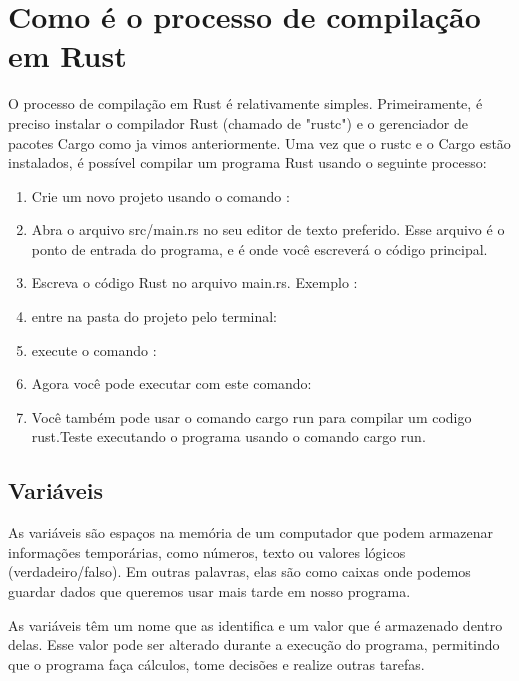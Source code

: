 \documentclass[12pt,a4paper,oneside]{abntex2}
\begin{document}
\section{Como é o processo de compilação em Rust}

O processo de compilação em Rust é relativamente simples. Primeiramente, é preciso instalar o compilador Rust (chamado de "rustc") e o gerenciador de pacotes Cargo como ja vimos anteriormente.
Uma vez que o rustc e o Cargo estão instalados, é possível compilar um programa Rust usando o seguinte processo:
\begin{enumerate}
    \item Crie um novo projeto usando o comando :
    
    \item Abra o arquivo src/main.rs no seu editor de texto preferido. Esse arquivo é o ponto de entrada do programa, e é onde você escreverá o código principal.
    \item Escreva o código Rust no arquivo main.rs. Exemplo :
    
    \item entre na pasta do projeto pelo terminal:
    \item execute o comando :
        
    \item Agora você pode executar com este comando:
    
    \item Você também pode usar o comando  cargo run para compilar um codigo rust.Teste executando o programa usando o comando cargo run.
\end{enumerate}

\subsection{Variáveis}
As variáveis são espaços na memória de um computador que podem armazenar informações temporárias, como números, texto ou valores lógicos (verdadeiro/falso). Em outras palavras, elas são como caixas onde podemos guardar dados que queremos usar mais tarde em nosso programa.

As variáveis têm um nome que as identifica e um valor que é armazenado dentro delas. Esse valor pode ser alterado durante a execução do programa, permitindo que o programa faça cálculos, tome decisões e realize outras tarefas.
\end{document}
